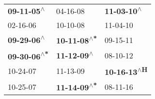 \begin{supertabular}{lll}
  \textbf{09-11-05\textsuperscript{$\wedge$}} &                    04-16-08\textsuperscript{} &   \textbf{11-03-10\textsuperscript{$\wedge$}} \\
                   02-16-06\textsuperscript{} &                    10-10-08\textsuperscript{} &                    11-04-10\textsuperscript{} \\
  \textbf{09-29-06\textsuperscript{$\wedge$}} &  \textbf{10-11-08\textsuperscript{$\wedge$*}} &                    09-15-11\textsuperscript{} \\
 \textbf{09-30-06\textsuperscript{$\wedge$*}} &   \textbf{11-12-09\textsuperscript{$\wedge$}} &                    08-10-12\textsuperscript{} \\
                   10-24-07\textsuperscript{} &                    11-13-09\textsuperscript{} &  \textbf{10-16-13\textsuperscript{$\wedge$H}} \\
                   10-25-07\textsuperscript{} &  \textbf{11-14-09\textsuperscript{$\wedge$*}} &                    08-11-16\textsuperscript{} \\
\end{supertabular}
